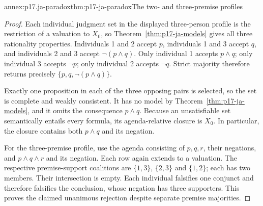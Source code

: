 \begin{annexitem}{annex:p17.ja-paradox}{thm:p17-ja-paradox}{The two- and three-premise profiles}
\begin{proof}
Each individual judgment set in the displayed three-person profile is the
restriction of a valuation to \(X_0\), so
Theorem~\ref{thm:p17-ja-models} gives all three rationality properties.
Individuals 1 and 2 accept \(p\), individuals 1 and 3 accept \(q\), and
individuals 2 and 3 accept \(\neg(p\land q)\). Only individual 1 accepts
\(p\land q\); only individual 3 accepts \(\neg p\); only individual 2
accepts \(\neg q\). Strict majority therefore returns precisely
\(\{p,q,\neg(p\land q)\}\).

Exactly one proposition in each of the three opposing pairs is selected, so the
set is complete and weakly consistent. It has no model by
Theorem~\ref{thm:p17-ja-models}, and it omits the consequence \(p\land q\).
Because an unsatisfiable set semantically entails every formula, its
agenda-relative closure is \(X_0\). In particular, the closure contains both
\(p\land q\) and its negation.

For the three-premise profile, use the agenda consisting of \(p,q,r\), their
negations, and \(p\land q\land r\) and its negation. Each row again extends to
a valuation. The respective premise-support coalitions are \(\{1,3\}\),
\(\{2,3\}\) and \(\{1,2\}\); each has two members. Their intersection is
empty. Each individual falsifies one conjunct and therefore falsifies the
conclusion, whose negation has three supporters. This proves the claimed
unanimous rejection despite separate premise majorities.
\end{proof}
\end{annexitem}

